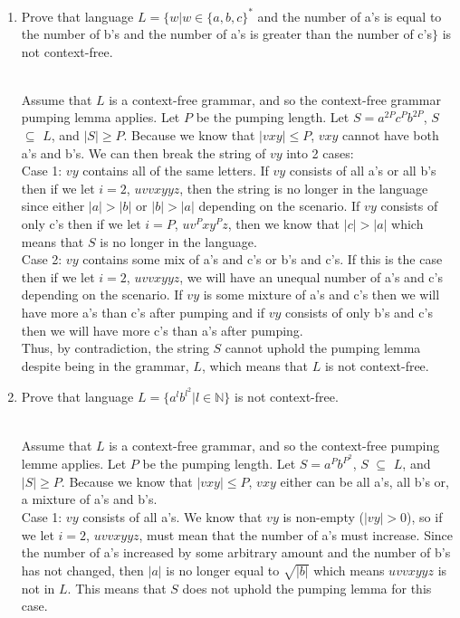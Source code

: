 \documentclass[11pt]{article}
\theoremstyle{definition}
\theoremstyle{theorem}
\newcommand{\solution}{\medskip\noindent{\color{blue}\textbf{Solution:}}}
\begin{document}
\begin{enumerate}[label=(\alph*)]
\begin{enumerate}[label=(\alph*)]
\item Prove that language $L = \{w | w \in \{a,b,c\}^*$ and the number of a's is equal to the number of b's and the number of a's is greater than the number of c's$\}$ is not context-free.

\solution \\
Assume that $L$ is a context-free grammar, and so the context-free grammar pumping lemma applies. Let $P$ be the pumping length. Let $S = a^{2P}c^{P}b^{2P}$,  $S$ $\subseteq$ $L$, and $|S| \geq P$. Because we know that $|vxy| \leq P$, $vxy$ cannot have both a's and b's. We can then break the string of $vy$ into 2 cases: \\

Case 1: $vy$ contains all of the same letters. If $vy$ consists of all a's or all b's then if we let $i = 2$, $uvvxyyz$, then the string is no longer in the language since either $|a| > |b|$ or $|b| > |a|$ depending on the scenario. If $vy$ consists of only c's then if we let $i = P$, $uv^Pxy^Pz$, then we know that $|c| > |a|$ which means that $S$ is no longer in the language. \\ 

Case 2: $vy$ contains some mix of a's and c's or b's and c's. If this is the case then if we let $i = 2$, $uvvxyyz$, we will have an unequal number of a's and c's depending on the scenario. If $vy$ is some mixture of a's and c's then we will have more a's than c's after pumping and if $vy$ consists of only b's and c's then we will have more c's than a's after pumping. \\

Thus, by contradiction, the string $S$ cannot uphold the pumping lemma despite being in the grammar, $L$, which means that $L$ is not context-free.
\item Prove that language $L = \{a^l b^{l^2} | l \in \mathbb{N}\}$ is not context-free.

\solution \\
Assume that $L$ is a context-free grammar, and so the context-free pumping lemme applies. Let $P$ be the pumping length. Let $S = a^Pb^{P^2}$, $S$ $\subseteq$ $L$, and $|S| \geq P$. Because we know that $|vxy| \leq P$, $vxy$ either can be all a's, all b's or, a mixture of a's and b's. \\

Case 1: $vy$ consists of all a's. We know that $vy$ is non-empty ($|vy| > 0$), so if we let $i = 2$, $uvvxyyz$, must mean that the number of a's must increase. Since the number of a's increased by some arbitrary amount and the number of b's has not changed, then $|a|$ is no longer equal to $\sqrt{|b|}$ which means $uvvxyyz$ is not in $L$. This means that $S$ does not uphold the pumping lemma for this case. \\


\end{enumerate}
\end{enumerate}
\end{document}
